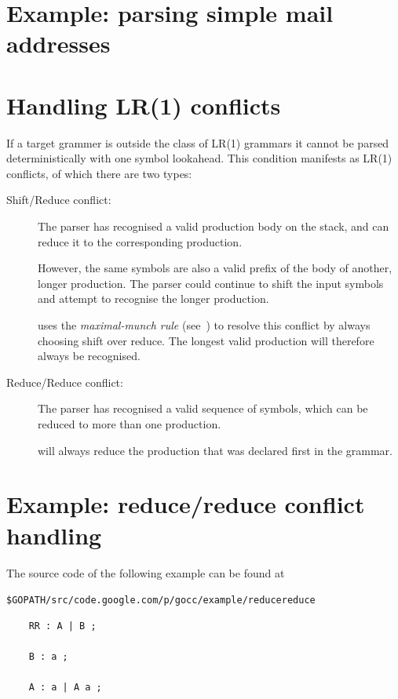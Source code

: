 \documentclass[12pt]{article}
\begin{document}
\section{Example: parsing simple mail addresses} \label{sec:example mail}
\TBD

\section{Handling LR(1) conflicts} \label{sec:lr conflicts}
	If a target grammer is outside the class of LR(1) grammars it cannot be parsed deterministically with one symbol lookahead. This condition manifests as LR(1) conflicts, of which there are two types:

	\begin{description}
		\item[Shift/Reduce conflict:] The parser has recognised a valid production body on the stack, and can reduce it to the corresponding production. 

		However, the same symbols are also a valid prefix of the body of another, longer production. The parser could continue to shift the input symbols and attempt to recognise the longer production.

		\gocc uses the {\em maximal-munch rule} (see~\cite{Modern Compiler Design}) to resolve this conflict by always choosing shift over reduce. The longest valid production will therefore always be recognised.

		\item[Reduce/Reduce conflict:] The parser has recognised a valid sequence of symbols, which can be reduced to more than one production.

		\gocc will always reduce the production that was declared first in the grammar.
	\end{description}

\section{Example: reduce/reduce conflict handling} \label{sec:example rr}
	The source code of the following example can be found at

	\verb|$GOPATH/src/code.google.com/p/gocc/example/reducereduce|

	\begin{verbatim}
	RR : A | B ;

	B : a ;

	A : a | A a ;

	\end{verbatim}
\end{document}
